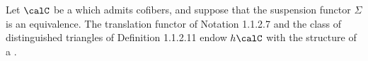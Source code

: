 \begin{theorem} \label{theorem:homotopy_category_of_a_pointed_infinity_category_with_cofibers_whose_suspension_is_an_equivalence_is_a_triangulated_category}

    Let $\calC$ be a  which admits cofibers, and suppose that the suspension functor $\Sigma$ is an equivalence. The translation functor of Notation 1.1.2.7 and the class of distinguished triangles of Definition 1.1.2.11 endow $h\calC$ with the structure of a .
\end{theorem}